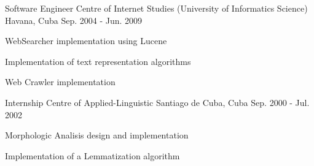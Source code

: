 \begin{cventries}
\cventry
{Software Engineer} %
{Centre of Internet Studies (University of Informatics Science)} %
{Havana, Cuba} %
{Sep. 2004 - Jun. 2009} %
{ %
\begin{cvitems}
\item {WebSearcher implementation using Lucene}
\item {Implementation of text representation algorithms}
\item {Web Crawler implementation}
\end{cvitems}
}


\cventry
{Internship} %
{Centre of Applied-Linguistic} %
{Santiago de Cuba, Cuba} %
{Sep. 2000 - Jul. 2002} %
{ %
\begin{cvitems}
\item {Morphologic Analisis design and implementation}
\item {Implementation of a Lemmatization algorithm}
\end{cvitems}
}


\end{cventries}
